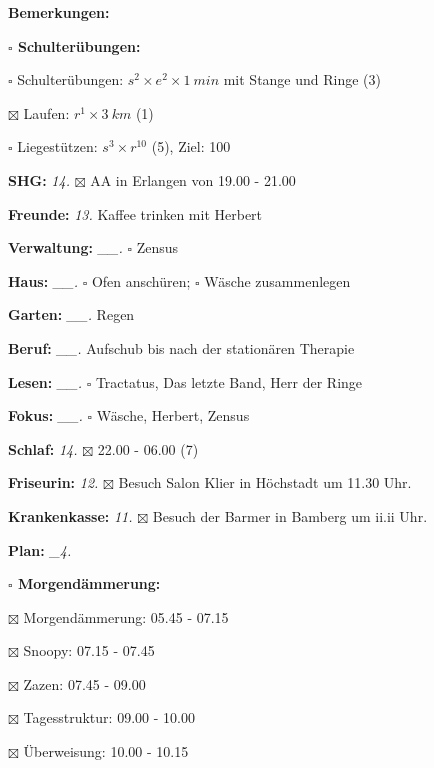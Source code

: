\documentclass[10pt,a4paper]{article}
\newcommand\prop[1] {{\color {alizarin} {\bf #1}}}             %
\newcommand\opti[1] {{\color {amethyst} {\bf #1}}}             %
\newcommand\mand[1] {{\color {burntorange} {\bf #1}}}          %
\newcommand\topspace{\vskip -15pt \hskip 20pt}
\newcommand\bottomspace{\vskip 4pt}
\newcommand\n[1] { {\sl #1.} \hskip 5pt }
\begin{document}
\begin{mdframed}[style=daystyle]
\begin{labeling}{{\mand {Bemerkungen:}}}
\begin{minipage}{0.75\textwidth}
\begin{labeling}{\prop {$\square$ {Schulterübungen:}}}
      \item[$\square$ Schulterübungen:] $s^2 \times e^2 \times 1\ min$ mit Stange und Ringe (3)
      \item[$\boxtimes$ Laufen:]          $r^1 \times 3\ km$ (1)
      \item[$\square$ Liegestützen:]    $s^3 \times r^{10}$ (5), Ziel: 100
      \end{labeling}
    \end{minipage}
    \bottomspace        
  \item[{\mand {SHG:}}]            \n{14} $\boxtimes$ AA in Erlangen von 19.00 - 21.00
  \item[{\mand {Freunde:}}]        \n{13} Kaffee trinken mit Herbert
  \item[{\mand {Verwaltung:}}]   \n{\_\_} $\square$ Zensus
  \item[{\mand {Haus:}}]         \n{\_\_} $\square$ Ofen anschüren; $\square$ Wäsche zusammenlegen
  \item[{\mand {Garten:}}]       \n{\_\_} Regen
  \item[{\mand {Beruf:}}]        \n{\_\_} Aufschub bis nach der stationären Therapie
  \item[{\mand {Lesen:}}]        \n{\_\_} $\square$ Tractatus, Das letzte Band, Herr der Ringe
  \item[{\mand {Fokus:}}]        \n{\_\_} $\square$ Wäsche, Herbert, Zensus
  \item[{\mand {Schlaf:}}]         \n{14} $\boxtimes$ 22.00 - 06.00 (7)
  \item[{\opti {Friseurin:}}]      \n{12} $\boxtimes$ Besuch Salon Klier in Höchstadt um 11.30 Uhr.
  \item[{\opti {Krankenkasse:}}]   \n{11} $\boxtimes$ Besuch der Barmer in Bamberg um ii.ii Uhr.
  \item[{\mand {Plan:}}]          \n{\_4}
    \topspace
    \begin{minipage}{0.75\textwidth}  
      \begin{labeling}{\prop {$\square$ {Morgendämmerung:}}} 
        \setlength\itemsep{-3pt}
      \item[$\boxtimes$ Morgendämmerung:] 05.45 - 07.15
      \item[$\boxtimes$ Snoopy:]          07.15 - 07.45
      \item[$\boxtimes$ Zazen:]           07.45 - 09.00
      \item[$\boxtimes$ Tagesstruktur:]   09.00 - 10.00
      \item[$\boxtimes$ Überweisung:]     10.00 - 10.15

\end{labeling}
\end{minipage}
\end{labeling}
\end{mdframed}
\end{document}
